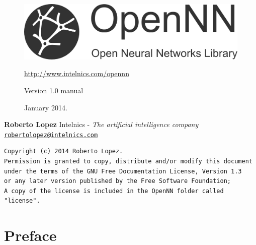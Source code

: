\documentclass[pdftex, a4paper, 10pt]{book}
\begin{document}
\vspace{5cm}

\begin{figure}[h!]
\begin{center}
\includegraphics[width=1.0\textwidth]{opennn_logo_name}
\end{center}
\href{http://www.intelnics.com/opennn}{http://www.intelnics.com/opennn}\newline

Version 1.0 manual\newline

January 2014.
\end{figure}

\begin{center}
\end{center}

\vspace{5cm}

{
\Large
\textbf{}\newline
\textbf{Roberto Lopez}\newline
Intelnics - \textit{The artificial intelligence company}\newline 
\href{mailto:robertolopez@intelnics.com}{\nolinkurl{robertolopez@intelnics.com}}
}

\vspace{5cm}


\begin{verbatim}
Copyright (c) 2014 Roberto Lopez.
Permission is granted to copy, distribute and/or modify this document
under the terms of the GNU Free Documentation License, Version 1.3
or any later version published by the Free Software Foundation;
A copy of the license is included in the OpenNN folder called "license". 
\end{verbatim}
      
\chapter*{Preface}	
	
 
\tableofcontents

\end{document}
